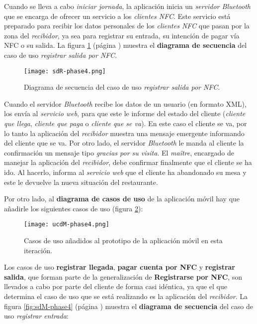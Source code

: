 Cuando se lleva a cabo \emph{iniciar jornada}, la aplicación inicia un
\emph{servidor Bluetooth} que se encarga de ofrecer un servicio a los
\emph{clientes \acs{NFC}}. Este servicio está preparado para recibir
los datos personales de los \emph{clientes \acs{NFC}} que pasan por la
zona del \emph{recibidor}, ya sea para registrar su entrada, su intención de
pagar vía \acs{NFC} o su salida. La figura \ref{fig:sdR-phase4} (página
\pageref{fig:sdR-phase4}) muestra el \textbf{diagrama de secuencia} del
caso de uso \emph{registrar salida por \acs{NFC}}.

  \begin{figure}[!h]
    \begin{center}
      \texttt{[image: sdR-phase4.png]}
      \caption{Diagrama de secuencia del caso de uso \emph{registrar salida
      por \acs{NFC}}.}
      \label{fig:sdR-phase4}
    \end{center}
  \end{figure}

Cuando el servidor \emph{Bluetooth} recibe los datos de un usuario (en formato
\acs{XML}), los envía al \emph{servicio web}, para que este le informe del
estado del cliente (\emph{cliente que llega}, \emph{cliente que paga} o
\emph{cliente que se va}). En este caso el cliente se va, por lo tanto la
aplicación del \emph{recibidor} muestra una mensaje emergente informando
del cliente que se va. Por otro lado, el servidor \emph{Bluetooth} le manda
al cliente la confirmación un mensaje tipo \emph{gracias por su visita}.
El \emph{maître}, encargado de manejar la aplicación del \emph{recibidor},
debe confirmar finalmente que el cliente se ha ido. Al hacerlo, informa
al \emph{servicio web} que el cliente ha abandonado su mesa y este le
devuelve la nueva situación del restaurante.

Por otro lado, al \textbf{diagrama de casos de uso} de la aplicación móvil
hay que añadirle los siguientes casos de uso (figura \ref{fig:ucdM-phase4}):

  \begin{figure}[!h]
    \begin{center}
      \texttt{[image: ucdM-phase4.png]}
      \caption{Casos de uso añadidos al prototipo de la aplicación
      móvil en esta iteración.}
      \label{fig:ucdM-phase4}
    \end{center}
  \end{figure}

Los casos de uso \textbf{registrar llegada}, \textbf{pagar cuenta por
\acs{NFC}} y \textbf{registrar salida}, que forman parte de la generalización
de \textbf{Registrarse por \acs{NFC}}, son llevados a cabo por parte del
cliente de forma casi idéntica, ya que el que determina el caso de uso que
se está realizando es la aplicación del \emph{recibidor}. La figura
\ref{fig:sdM-phase4} (página \pageref{fig:sdM-phase4}) muestra el
\textbf{diagrama de secuencia} del caso de uso \emph{registrar entrada}:

